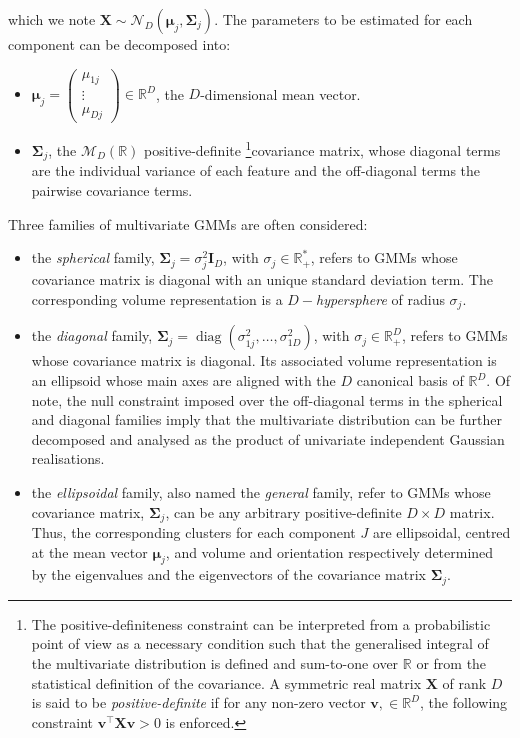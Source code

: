 which we note
\(\boldsymbol{X} \sim \mathcal{N}_D(\boldsymbol{\mu}_j, \boldsymbol{\Sigma}_j)\). The parameters to be estimated for each component can be decomposed into:

\begin{itemize}
\item
  \(\boldsymbol{\mu}_j=\begin{pmatrix} \mu_{1j} \\ \vdots \\ \mu_{Dj} \end{pmatrix} \in \mathbb{R}^D\), the \(D\)-dimensional mean vector.
\item
  \(\boldsymbol{\Sigma}_j\), the \(\mathcal{M}_D(\mathbb{R})\) positive-definite \footnote{The positive-definiteness constraint can be interpreted from a probabilistic point of view as a necessary condition such that the generalised integral of the multivariate distribution is defined and sum-to-one over \(\mathbb{R}\) or from the statistical definition of the covariance. A symmetric real matrix \(\boldsymbol{X}\) of rank \(D\) is said to be \emph{positive-definite} if for any non-zero vector
    \(\mathbf{v}, \in \mathbb{R}^D\), the following constraint
    \(\mathbf{v}^\top \boldsymbol{X} \mathbf{v} > 0\) is enforced.}covariance matrix, whose diagonal terms are the individual variance of each feature and the off-diagonal terms the pairwise covariance terms.
\end{itemize}

Three families of multivariate GMMs are often considered:

\begin{itemize}
\tightlist
\item
  the \emph{spherical} family, \(\boldsymbol{\Sigma}_j=\sigma_j^2 \boldsymbol{I}_D\), with \(\sigma_j \in \mathbb{R}_{+}^*\), refers to GMMs whose covariance matrix is diagonal with an unique standard deviation term. The corresponding volume representation is a \(D-\)\emph{hypersphere} of radius \(\sigma_j\).
\item
  the \emph{diagonal} family, \(\boldsymbol{\Sigma}_j=\operatorname{diag} \left(\sigma_{1j}^2, \ldots, \sigma_{1D}^2\right)\), with \(\sigma_j \in \mathbb{R}_{+}^D\), refers to GMMs whose covariance matrix is diagonal. Its associated volume representation is an ellipsoid whose main axes are aligned with the \(D\) canonical basis of \(\mathbb{R}^D\). Of note, the null constraint imposed over the off-diagonal terms in the spherical and diagonal families imply that the multivariate distribution can be further decomposed and analysed as the product of univariate independent Gaussian realisations.
\item
  the \emph{ellipsoidal} family, also named the \emph{general} family, refer to GMMs whose covariance matrix, \(\boldsymbol{\Sigma}_j\), can be any arbitrary positive-definite \(D \times D\) matrix. Thus, the corresponding clusters for each component \(J\) are ellipsoidal, centred at the mean vector \(\boldsymbol{\mu}_j\), and volume and orientation respectively determined by the eigenvalues and the eigenvectors of the covariance matrix \(\boldsymbol{\Sigma}_j\).
\end{itemize}

